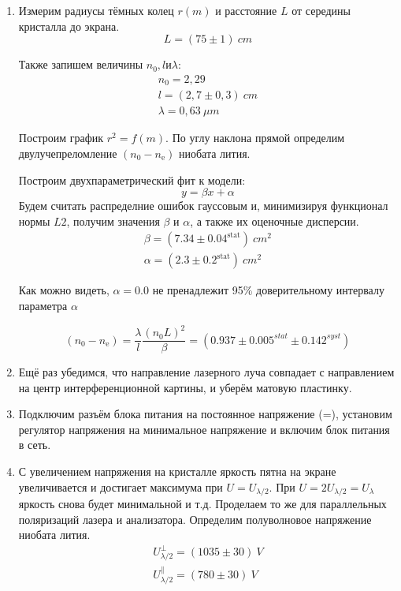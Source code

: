 \begin{enumerate}
    \item
    Измерим радиусы тёмных колец $r(m)$ и расстояние $L$ от середины кристалла до экрана.
    $$ L = (75\pm 1)~cm$$
    
    Также запишем величины $n_0, l и \lambda$:
    \begin{gather*}
        n_0 = 2,29\\
        l = (2,7 \pm 0,3)~cm\\
        \lambda = 0,63~\mu m
    \end{gather*}
    
    Построим график $r^2 = f(m)$. По углу наклона прямой определим двулучепреломление $(n_0 - n_{\text{e}})$ ниобата лития.
    
    \begin{figure}[h]
    \end{figure}
    
    Построим двухпараметрический фит к модели:
    $$ y = \beta x + \alpha $$
    Будем считать распределние ошибок гауссовым и,  минимизируя функционал нормы $L2$, получим значения $\beta$ и $\alpha$, а также их оценочные дисперсии.
    \begin{gather*}
    \beta = (7.34\pm0.04^{\text{stat}})~{cm^2}\\
    \alpha = (2.3\pm0.2^{\text{stat}})~{cm^2}
    \end{gather*}
    
    Как можно видеть, $\alpha = 0.0$ не пренадлежит 95\% доверительному интервалу параметра $\alpha$
    
    $$(n_0 - n_{\text{e}}) = \frac{\lambda}{l} \frac{(n_0 L)^2}{\beta} = (0.937 \pm 0.005^{stat}\pm0.142^{syst})$$
    
    \item
    Ещё раз убедимся, что направление лазерного луча совпадает с направлением на центр интерференционной картины, и уберём матовую пластинку. 
    
    \item
    Подключим разъём блока питания на постоянное напряжение (=), установим регулятор напряжения на минимальное напряжение и включим блок питания в сеть.    
    
    \item
    С увеличением напряжения на кристалле яркость пятна на экране увеличивается и достигает максимума при $U = U_{\lambda/2}$. При $U = 2U_{\lambda/2} = U_\lambda$ яркость снова будет минимальной и т.д. Проделаем то же для параллельных поляризаций лазера и анализатора. Определим полуволновое напряжение ниобата лития.
    \begin{gather*}
    U_{\lambda/2}^{\perp} = (1035 \pm 30)~V\\
    U_{\lambda/2}^{\parallel} = (780 \pm 30)~V
    \end{gather*}
    

\end{enumerate}
